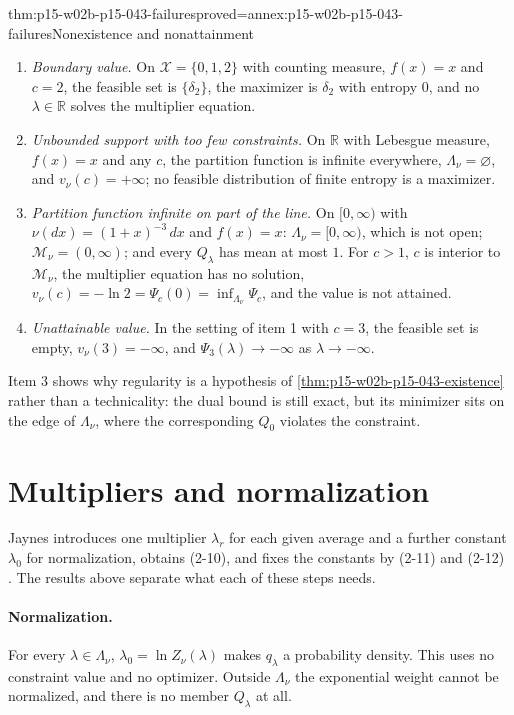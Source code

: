 \begin{hbtheorem}{thm:p15-w02b-p15-043-failures}{proved=annex:p15-w02b-p15-043-failures}{Nonexistence and nonattainment}
\begin{enumerate}
\item \emph{Boundary value.} On \(\mathcal X=\{0,1,2\}\) with counting
measure, \(f(x)=x\) and \(c=2\), the feasible set is \(\{\delta_2\}\),
the maximizer is \(\delta_2\) with entropy \(0\), and no
\(\lambda\in\mathbb R\) solves the multiplier equation.
\item \emph{Unbounded support with too few constraints.} On \(\mathbb R\)
with Lebesgue measure, \(f(x)=x\) and any \(c\), the partition function is
infinite everywhere, \(\Lambda_\nu=\varnothing\), and \(v_\nu(c)=+\infty\);
no feasible distribution of finite entropy is a maximizer.
\item \emph{Partition function infinite on part of the line.} On
\([0,\infty)\) with \(\nu(dx)=(1+x)^{-3}\,dx\) and \(f(x)=x\):
\(\Lambda_\nu=[0,\infty)\), which is not open;
\(\mathcal M_\nu=(0,\infty)\); and every \(Q_\lambda\) has mean at most
\(1\). For \(c>1\), \(c\) is interior to \(\mathcal M_\nu\), the
multiplier equation has no solution, \(v_\nu(c)=-\ln2=\Psi_c(0)
=\inf_{\Lambda_\nu}\Psi_c\), and the value is not attained.
\item \emph{Unattainable value.} In the setting of item 1 with \(c=3\), the
feasible set is empty, \(v_\nu(3)=-\infty\), and
\(\Psi_3(\lambda)\to-\infty\) as \(\lambda\to-\infty\).
\end{enumerate}
\end{hbtheorem}

Item 3 shows why regularity is a hypothesis of
\cref{thm:p15-w02b-p15-043-existence} rather than a technicality: the
dual bound is still exact, but its minimizer sits on the edge of
\(\Lambda_\nu\), where the corresponding \(Q_0\) violates the constraint.

\section{Multipliers and normalization}
\label{sec:p15-w02b-p15-043-multipliers}

Jaynes introduces one multiplier \(\lambda_r\) for each given average and a
further constant \(\lambda_0\) for normalization, obtains (2-10), and fixes
the constants by (2-11) and (2-12) \cite[p.~623]{Jaynes1957InformationTheory}.
The results above separate what each of these steps needs.

\paragraph{Normalization.}
For every \(\lambda\in\Lambda_\nu\), \(\lambda_0=\ln Z_\nu(\lambda)\) makes
\(q_\lambda\) a probability density. This uses no constraint value and no
optimizer. Outside \(\Lambda_\nu\) the exponential weight cannot be
normalized, and there is no member \(Q_\lambda\) at all.

